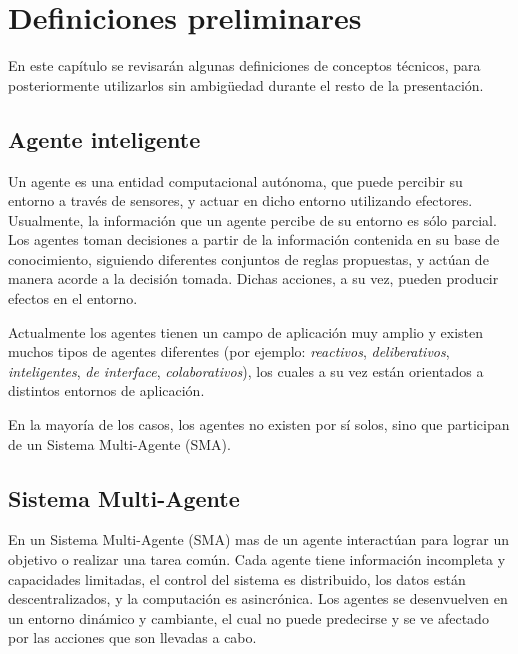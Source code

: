
\chapter{Definiciones preliminares} 
\label{chap:definiciones_preliminares}

 En este capítulo se revisarán algunas definiciones de conceptos
 técnicos, para posteriormente utilizarlos sin ambigüedad durante el
 resto de la presentación.

\section{Agente inteligente}
\label{sec:agente_inteligente}
 
 Un agente es una entidad computacional autónoma, que puede percibir su
 entorno a través de sensores, y actuar en dicho entorno utilizando
 efectores.
 Usualmente, la información que un agente percibe de su entorno es sólo
 parcial.
 Los agentes toman decisiones a partir de la información contenida en
 su base de conocimiento, siguiendo diferentes conjuntos de reglas
 propuestas, y actúan de manera acorde a la decisión tomada.
 Dichas acciones, a su vez, pueden producir efectos en el entorno.
 
 Actualmente los agentes tienen un campo de aplicación muy amplio y
 existen muchos tipos de agentes diferentes (por ejemplo:
 \textit{reactivos}, \textit{deliberativos}, \textit{inteligentes},
 \textit{de interface}, \textit{colaborativos}), los cuales a su vez
 están orientados a distintos entornos de aplicación.
 
 En la mayoría de los casos, los agentes no existen por sí solos, sino
 que participan de un Sistema Multi-Agente (SMA).

\section{Sistema Multi-Agente}
\label{sec:sistema_multiagente}
 
 En un Sistema Multi-Agente (SMA) mas de un agente interactúan para
 lograr un objetivo o realizar una tarea común.
 Cada agente tiene información incompleta y capacidades limitadas, el
 control del sistema es distribuido, los datos están descentralizados,
 y la computación es asincrónica.
 Los agentes se desenvuelven en un entorno dinámico y cambiante, el
 cual no puede predecirse y se ve afectado por las acciones que son
 llevadas a cabo.
 
